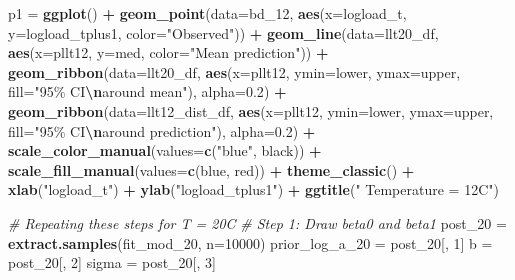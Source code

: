 \documentclass[
]{article}
\newenvironment{Shaded}{\begin{snugshade}}{\end{snugshade}}
\newcommand{\AttributeTok}[1]{\textcolor[rgb]{0.13,0.29,0.53}{#1}}
\newcommand{\CommentTok}[1]{\textcolor[rgb]{0.56,0.35,0.01}{\textit{#1}}}
\newcommand{\DecValTok}[1]{\textcolor[rgb]{0.00,0.00,0.81}{#1}}
\newcommand{\FloatTok}[1]{\textcolor[rgb]{0.00,0.00,0.81}{#1}}
\newcommand{\FunctionTok}[1]{\textcolor[rgb]{0.13,0.29,0.53}{\textbf{#1}}}
\newcommand{\NormalTok}[1]{#1}
\newcommand{\OtherTok}[1]{\textcolor[rgb]{0.56,0.35,0.01}{#1}}
\newcommand{\SpecialCharTok}[1]{\textcolor[rgb]{0.81,0.36,0.00}{\textbf{#1}}}
\newcommand{\StringTok}[1]{\textcolor[rgb]{0.31,0.60,0.02}{#1}}
\begin{document}
\begin{Shaded}
\begin{Highlighting}[]
\NormalTok{p1 }\OtherTok{=} \FunctionTok{ggplot}\NormalTok{() }\SpecialCharTok{+} \FunctionTok{geom\_point}\NormalTok{(}\AttributeTok{data=}\NormalTok{bd\_12, }\FunctionTok{aes}\NormalTok{(}\AttributeTok{x=}\NormalTok{logload\_t, }\AttributeTok{y=}\NormalTok{logload\_tplus1, }\AttributeTok{color=}\StringTok{"Observed"}\NormalTok{)) }\SpecialCharTok{+}
           \FunctionTok{geom\_line}\NormalTok{(}\AttributeTok{data=}\NormalTok{llt20\_df, }\FunctionTok{aes}\NormalTok{(}\AttributeTok{x=}\NormalTok{pllt12, }\AttributeTok{y=}\NormalTok{med, }\AttributeTok{color=}\StringTok{"Mean prediction"}\NormalTok{)) }\SpecialCharTok{+} 
           \FunctionTok{geom\_ribbon}\NormalTok{(}\AttributeTok{data=}\NormalTok{llt20\_df, }\FunctionTok{aes}\NormalTok{(}\AttributeTok{x=}\NormalTok{pllt12, }\AttributeTok{ymin=}\NormalTok{lower, }\AttributeTok{ymax=}\NormalTok{upper, }\AttributeTok{fill=}\StringTok{"95\% CI}\SpecialCharTok{\textbackslash{}n}\StringTok{around mean"}\NormalTok{), }
                                         \AttributeTok{alpha=}\FloatTok{0.2}\NormalTok{) }\SpecialCharTok{+}
           \FunctionTok{geom\_ribbon}\NormalTok{(}\AttributeTok{data=}\NormalTok{llt12\_dist\_df, }\FunctionTok{aes}\NormalTok{(}\AttributeTok{x=}\NormalTok{pllt12, }\AttributeTok{ymin=}\NormalTok{lower, }\AttributeTok{ymax=}\NormalTok{upper, }\AttributeTok{fill=}\StringTok{"95\% CI}\SpecialCharTok{\textbackslash{}n}\StringTok{around prediction"}\NormalTok{), }
                                         \AttributeTok{alpha=}\FloatTok{0.2}\NormalTok{) }\SpecialCharTok{+}
           \FunctionTok{scale\_color\_manual}\NormalTok{(}\AttributeTok{values=}\FunctionTok{c}\NormalTok{(}\StringTok{"blue"}\NormalTok{, }\StringTok{\textquotesingle{}black\textquotesingle{}}\NormalTok{)) }\SpecialCharTok{+}
           \FunctionTok{scale\_fill\_manual}\NormalTok{(}\AttributeTok{values=}\FunctionTok{c}\NormalTok{(}\StringTok{\textquotesingle{}blue\textquotesingle{}}\NormalTok{, }\StringTok{\textquotesingle{}red\textquotesingle{}}\NormalTok{)) }\SpecialCharTok{+}
           \FunctionTok{theme\_classic}\NormalTok{() }\SpecialCharTok{+}
           \FunctionTok{xlab}\NormalTok{(}\StringTok{"logload\_t"}\NormalTok{) }\SpecialCharTok{+} \FunctionTok{ylab}\NormalTok{(}\StringTok{"logload\_tplus1"}\NormalTok{) }\SpecialCharTok{+} \FunctionTok{ggtitle}\NormalTok{(}\StringTok{" Temperature = 12C"}\NormalTok{)}

\CommentTok{\# Repeating these steps for T = 20C }
\CommentTok{\# Step 1: Draw beta0 and beta1}
\NormalTok{post\_20 }\OtherTok{=} \FunctionTok{extract.samples}\NormalTok{(fit\_mod\_20, }\AttributeTok{n=}\DecValTok{10000}\NormalTok{)}
\NormalTok{prior\_log\_a\_20 }\OtherTok{=}\NormalTok{ post\_20[, }\DecValTok{1}\NormalTok{]}
\NormalTok{b }\OtherTok{=}\NormalTok{ post\_20[, }\DecValTok{2}\NormalTok{]}
\NormalTok{sigma }\OtherTok{=}\NormalTok{ post\_20[, }\DecValTok{3}\NormalTok{]}


\end{Highlighting}
\end{Shaded}
\end{document}
